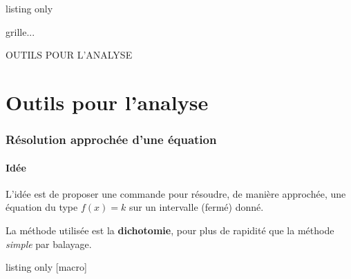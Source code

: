\documentclass[a4paper,french,11pt]{article}
\newcommand\cmaj[1]{%
	{\tcbox[vignetteMaJ]{#1}\xspace}%
}
\begin{document}
\begin{PresCodeTexPL}{listing only}
\begin{EnvSudoMaths}[options]{grille}...\end{EnvSudoMaths}
\end{PresCodeTexPL}

\newpage

\phantom{t}\par\vfill\par
\begin{PART}
	\begin{center}
		\Huge\MakeUppercase{Outils pour l'analyse}
	\end{center}
\end{PART}
\par\vfill\par\phantom{t}

\newpage

\part{Outils pour l'analyse}

\section{Résolution approchée d'une équation}\label{resolapprox}

\subsection{Idée}

\begin{tipblock}
\cmaj{2.1.4} L'idée est de proposer une commande pour résoudre, de manière approchée, une équation du type $f(x)=k$ sur un intervalle (fermé) donné.

\smallskip

La méthode utilisée est la \textbf{dichotomie}, pour plus de rapidité que la méthode \textit{simple} par balayage.
\end{tipblock}

\begin{PresCodeTexPL}{listing only}
[macro]
\end{PresCodeTexPL}
\end{document}
